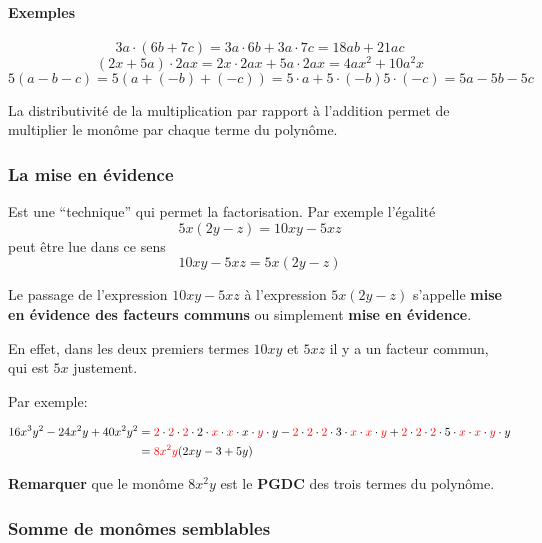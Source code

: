 \documentclass[
  12pt,
]{book}
\begin{document}
\hypertarget{exemples-10}{%
\paragraph*{Exemples}\label{exemples-10}}

\[3a\cdot(6b+7c) = 3a\cdot 6b+ 3a\cdot 7c = 18ab+21ac\]
\[(2x+5a)\cdot 2ax=2x\cdot 2ax + 5a\cdot 2ax = 4ax^2+10a^2x\]
\[5(a-b-c) = 5(a+(-b)+(-c))=5\cdot a+5\cdot(-b) 5\cdot(-c) = 5a-5b-5c\]

La distributivité de la multiplication par rapport à l'addition permet de multiplier le monôme par chaque terme du polynôme.

\hypertarget{la-mise-en-uxe9vidence}{%
\subsubsection*{La mise en évidence}\label{la-mise-en-uxe9vidence}}

Est une ``technique'' qui permet la factorisation. Par exemple l'égalité
\[5x(2y-z) = 10xy-5xz\]
peut être lue dans ce sens
\[10xy-5xz= 5x(2y-z)\]

Le passage de l'expression \(10xy-5xz\) à l'expression \(5x(2y-z)\) s'appelle \textbf{mise en évidence des facteurs communs} ou simplement \textbf{mise en évidence}.

En effet, dans les deux premiers termes \(10xy\) et \(5xz\) il y a un facteur commun, qui est \(5x\) justement.

Par exemple:

\begin{align*} 
16x^3y^2-24x^2y+40x^2y^2 & ={\color{red}2}\cdot {\color{red}2}\cdot {\color{red}2} \cdot 2\cdot {\color{red}x}\cdot{\color{red}x}\cdot x\cdot {\color{red}y}\cdot y - {\color{red}2}\cdot {\color{red}2}\cdot {\color{red}2} \cdot 3\cdot{\color{red}x}\cdot{\color{red}x}\cdot{\color{red}y} +{\color{red}2}\cdot {\color{red}2}\cdot {\color{red}2} \cdot 5\cdot{\color{red}x}\cdot{\color{red}x}\cdot{\color{red}y}\cdot y\\
& = {\color{red}8x^2y}(2xy-3+5y)\\
\end{align*}

\textbf{Remarquer} que le monôme \(8x^2y\) est le \textbf{PGDC} des trois termes du polynôme.

\hypertarget{somme-de-monuxf4mes-semblables}{%
\subsubsection{Somme de monômes semblables}\label{somme-de-monuxf4mes-semblables}}
\end{document}
